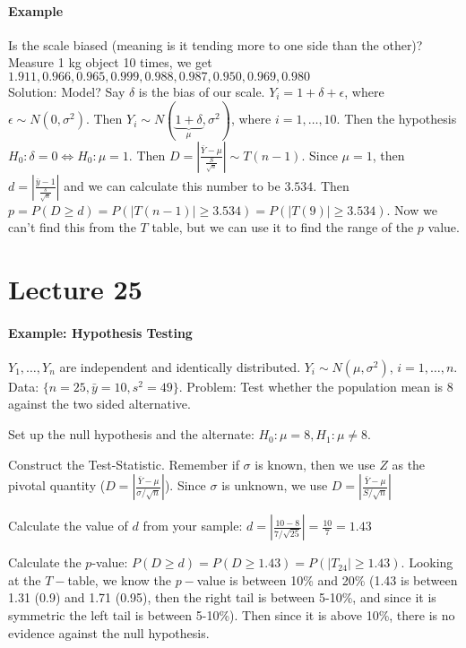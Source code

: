 \documentclass[10pt,letter]{article}
\theoremstyle{plain}
\theoremstyle{definition}
\begin{document}
\paragraph{Example}
Is the scale biased (meaning is it tending more to one side than the other)? Measure 1 kg object 10 times, we get $1.911,0.966,0.965,0.999,0.988,0.987,0.950,0.969,0.980$ \\ 
Solution: Model? Say $\delta$ is the bias of our scale. $Y_i=1+\delta+\epsilon$, where $\epsilon\sim N(0,\sigma^2)$. Then $Y_i\sim N(\underbrace{1+\delta}_{\mu},\sigma^2)$, where $i=1,\ldots,10$. Then the hypothesis $H_0:\delta=0\Leftrightarrow H_0:\mu=1$. Then $D=\left|\frac{\bar{Y}-\mu}{\frac{S}{\sqrt{n}}}\right|\sim T(n-1)$. Since $\mu=1$, then $d=\left|\frac{\bar{y}-1}{\frac{s}{\sqrt{n}}}\right|$ and we can calculate this number to be $3.534$. Then $p=P(D\geq d)=P(|T(n-1)|\geq3.534)=P(|T(9)|\geq3.534)$. Now we can't find this from the $T$ table, but we can use it to find the range of the $p$ value. 

\section*{Lecture 25}
\paragraph{Example: Hypothesis Testing}
$Y_1,\ldots,Y_n$ are independent and identically distributed. $Y_i\sim N(\mu,\sigma^2)$, $i=1,\ldots,n$. Data: $\lbrace n=25,\bar{y}=10,s^2=49\rbrace$. Problem: Test whether the population mean is $8$ against the two sided alternative. \\ 
\begin{steps}
     \item Set up the null hypothesis and the alternate: $H_0:\mu=8,H_1:\mu\neq8$. 
     \item Construct the Test-Statistic. Remember if $\sigma$ is known, then we use $Z$ as the pivotal quantity ($D=\left|\frac{\bar{Y}-\mu}{\sigma/\sqrt{n}}\right|$). Since $\sigma$ is unknown, we use $D=\left|\frac{\bar{Y}-\mu}{S/\sqrt{n}}\right|$ 
     \item Calculate the value of $d$ from your sample: $d=\left|\frac{10-8}{7/\sqrt{25}}\right|=\frac{10}{7}=1.43$ 
     \item Calculate the $p$-value: $P(D\geq d)=P(D\geq1.43)=P(|T_{24}|\geq1.43)$. Looking at the $T-$table, we know the $p-$value is between 10\% and 20\% (1.43 is between 1.31 (0.9) and 1.71 (0.95), then the right tail is between 5-10\%, and since it is symmetric the left tail is between 5-10\%). Then since it is above 10\%, there is no evidence against the null hypothesis. 
\end{steps}
\end{document}

